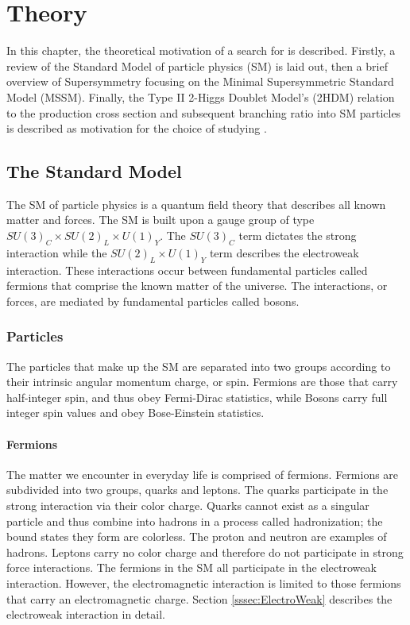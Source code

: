 \chapter{Theory}\label{sec:Theory}
    In this chapter, the theoretical motivation of a search for \HpmLong is described. Firstly, a review of the Standard Model of particle physics (SM) is laid out, then a brief overview of Supersymmetry focusing on the Minimal Supersymmetric Standard Model (MSSM). Finally, the Type II 2-Higgs Doublet Model's (2HDM) relation to the \Hpm production cross section and subsequent branching ratio into SM particles is described as motivation for the choice of studying \HpmLong.

\section{The Standard Model}\label{sec:SM}
	 The SM of particle physics is a quantum field theory that describes all known matter and forces. The SM is built upon a gauge group of type $SU(3)_C \times SU(2)_L \times U(1)_Y$. The $SU(3)_C$ term dictates the strong interaction while the $SU(2)_L \times U(1)_Y$ term describes the electroweak interaction. These interactions occur between fundamental particles called fermions that comprise the known matter of the universe. The interactions, or forces, are mediated by fundamental particles called bosons. 

	\subsection{Particles}\label{ssec:Particles}
		The particles that make up the SM are separated into two groups according to their intrinsic angular momentum charge, or spin. Fermions are those that carry half-integer spin, and thus obey Fermi-Dirac statistics, while Bosons carry full integer spin values and obey Bose-Einstein statistics.
		
		\subsubsection{Fermions}\label{sssec:Fermions}
			The matter we encounter in everyday life is comprised of fermions. Fermions are subdivided into two groups, quarks and leptons. The quarks participate in the strong interaction via their color charge. Quarks cannot exist as a singular particle and thus combine into hadrons in a process called hadronization; the bound states they form are colorless. The proton and neutron are examples of hadrons. Leptons carry no color charge and therefore do not participate in strong force interactions. The fermions in the SM all participate in the electroweak interaction. However, the electromagnetic interaction is limited to those fermions that carry an electromagnetic charge. Section \ref{sssec:ElectroWeak} describes the electroweak interaction in detail.

